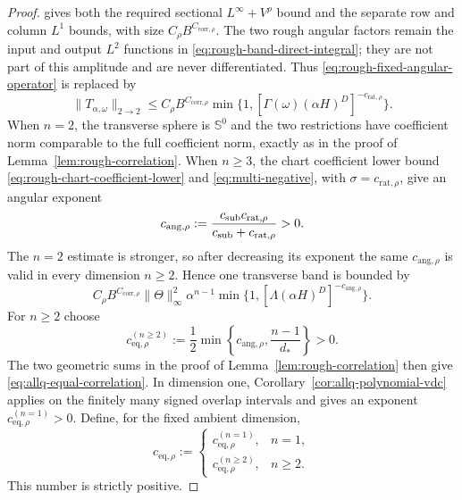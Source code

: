 \documentclass[11pt]{article}
\numberwithin{equation}{section}
\theoremstyle{remark}
\theoremstyle{definition}
\begin{document}
\begin{proof}
gives both the required sectional $L^\infty+V^\rho$ bound and the separate
row and column $L^1$ bounds, with size
$C_\rho B^{C_{\mathrm{corr},\rho}}$.  The two rough angular factors remain
the input and output $L^2$ functions in
\eqref{eq:rough-band-direct-integral}; they are not part of this amplitude
and are never differentiated.  Thus
\eqref{eq:rough-fixed-angular-operator} is replaced by
\[
 \|T_{\alpha,\omega}\|_{2\to2}
 \le C_\rho B^{C_{\mathrm{corr},\rho}}
 \min\{1,[\Gamma(\omega)(\alpha H)^D]^{-c_{\mathrm{rat},\rho}}\}.
\]
When $n=2$, the transverse sphere is $\mathbb S^0$ and the two
restrictions have coefficient norm comparable to the full coefficient
norm, exactly as in the proof of Lemma~\ref{lem:rough-correlation}. When
$n\ge3$, the chart coefficient lower bound
\eqref{eq:rough-chart-coefficient-lower} and
\eqref{eq:multi-negative}, with
$\sigma=c_{\mathrm{rat},\rho}$, give an angular exponent
\begin{equation}\label{eq:allq-equal-angular-exponent}
 c_{\mathrm{ang},\rho}
 :=\frac{c_{\rm sub}c_{\mathrm{rat},\rho}}
         {c_{\rm sub}+c_{\mathrm{rat},\rho}}>0.
\end{equation}
The $n=2$ estimate is stronger, so after decreasing its exponent the same
$c_{\mathrm{ang},\rho}$ is valid in every dimension $n\ge2$. Hence one
transverse band is bounded by
\[
 C_\rho B^{C_{\mathrm{corr},\rho}}\|\Theta\|_\infty^2
 \alpha^{n-1}
 \min\{1,[\Lambda(\alpha H)^D]^{-c_{\mathrm{ang},\rho}}\}.
\]
For $n\ge2$ choose
\begin{equation}\label{eq:allq-equal-final-exponent}
 c_{\mathrm{eq},\rho}^{(n\ge2)}
 :=\frac12\min\left\{c_{\mathrm{ang},\rho},
                     \frac{n-1}{d_*}\right\}>0.
\end{equation}
The two geometric sums in the proof of
Lemma~\ref{lem:rough-correlation} then give
\eqref{eq:allq-equal-correlation}. In dimension one,
Corollary~\ref{cor:allq-polynomial-vdc} applies on the finitely many signed
overlap intervals and gives an exponent
$c_{\mathrm{eq},\rho}^{(n=1)}>0$. Define, for the fixed ambient dimension,
\[
 c_{\mathrm{eq},\rho}
 :=\begin{cases}
 c_{\mathrm{eq},\rho}^{(n=1)},&n=1,\\
 c_{\mathrm{eq},\rho}^{(n\ge2)},&n\ge2.
 \end{cases}
\]
This number is strictly positive.


\end{proof}
\end{document}
